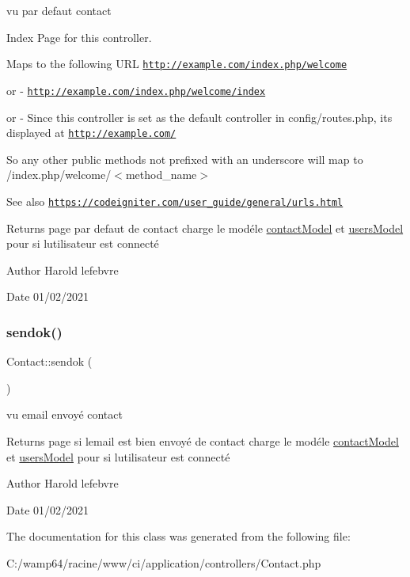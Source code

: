 vu par defaut contact 

Index Page for this controller.

Maps to the following U\+RL \href{http://example.com/index.php/welcome}{\tt http\+://example.\+com/index.\+php/welcome}
\begin{DoxyItemize}
\item or -\/ \href{http://example.com/index.php/welcome/index}{\tt http\+://example.\+com/index.\+php/welcome/index}
\item or -\/ Since this controller is set as the default controller in config/routes.\+php, it\textquotesingle{}s displayed at \href{http://example.com/}{\tt http\+://example.\+com/}
\end{DoxyItemize}

So any other public methods not prefixed with an underscore will map to /index.php/welcome/$<$method\+\_\+name$>$ \begin{DoxySeeAlso}{See also}
\href{https://codeigniter.com/user_guide/general/urls.html}{\tt https\+://codeigniter.\+com/user\+\_\+guide/general/urls.\+html} 
\end{DoxySeeAlso}
\begin{DoxyReturn}{Returns}
page par defaut de contact charge le modéle \mbox{\hyperlink{classcontact_model}{contact\+Model}} et \mbox{\hyperlink{classusers_model}{users\+Model}} pour si l\textquotesingle{}utilisateur est connecté 
\end{DoxyReturn}
\begin{DoxyAuthor}{Author}
Harold lefebvre 
\end{DoxyAuthor}
\begin{DoxyDate}{Date}
01/02/2021 
\end{DoxyDate}
\mbox{\label{class_contact_abd272ba0011aa80d58eafb993f8a434e}} 
\subsubsection{\texorpdfstring{sendok()}{sendok()}}
{\footnotesize\ttfamily Contact\+::sendok (\begin{DoxyParamCaption}{ }\end{DoxyParamCaption})}



vu email envoyé contact 

\begin{DoxyReturn}{Returns}
page si l\textquotesingle{}email est bien envoyé de contact charge le modéle \mbox{\hyperlink{classcontact_model}{contact\+Model}} et \mbox{\hyperlink{classusers_model}{users\+Model}} pour si l\textquotesingle{}utilisateur est connecté 
\end{DoxyReturn}
\begin{DoxyAuthor}{Author}
Harold lefebvre 
\end{DoxyAuthor}
\begin{DoxyDate}{Date}
01/02/2021 
\end{DoxyDate}


The documentation for this class was generated from the following file\+:\begin{DoxyCompactItemize}
\item 
C\+:/wamp64/racine/www/ci/application/controllers/Contact.\+php\end{DoxyCompactItemize}
